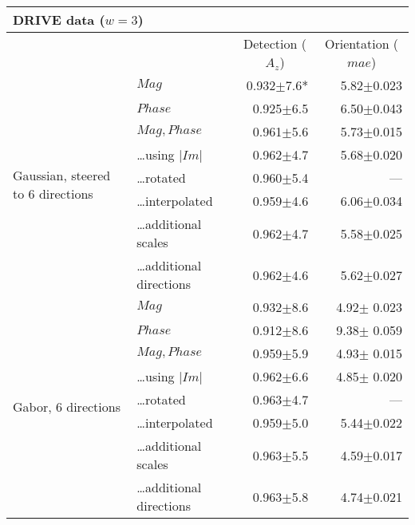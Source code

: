 
\begin{tabularx}{\columnwidth}{X X r r}
\toprule
\multicolumn{4}{p{\columnwidth}}{ DRIVE data ($w = 3$)} \\
\midrule
        &                               & \multicolumn{1}{c}{Detection  \linebreak ($A_z$)}
                                        & \multicolumn{1}{c}{Orientation  \linebreak ($mae$)} \\
\midrule
\multirow{8}{2cm}{Gaussian, steered to 6 directions}
        & $Mag$                         & 0.932$\pm$7.6*    & 5.82$\pm$0.023 \\
        & $Phase$                       & 0.925$\pm$6.5    & 6.50$\pm$0.043 \\
        & $Mag, Phase$                  & 0.961$\pm$5.6     & 5.73$\pm$0.015 \\
        & \ldots using $|Im|$           & 0.962$\pm$4.7     & 5.68$\pm$0.020 \\
        & \ldots rotated                & 0.960$\pm$5.4     & --- \\
        & \ldots interpolated           & 0.959$\pm$4.6     & 6.06$\pm$0.034 \\
        & \ldots additional scales      & 0.962$\pm$4.7     & 5.58$\pm$0.025 \\
        & \ldots additional directions  & 0.962$\pm$4.6     & 5.62$\pm$0.027 \\
\midrule
\multirow{8}{2cm}{Gabor, 6 directions}
        & $Mag$                         & 0.932$\pm$8.6     & 4.92$\pm$ 0.023 \\
        & $Phase$                       & 0.912$\pm$8.6     & 9.38$\pm$ 0.059 \\
        & $Mag,Phase$                   & 0.959$\pm$5.9     & 4.93$\pm$ 0.015 \\
        & \ldots using $|Im|$           & 0.962$\pm$6.6     & 4.85$\pm$ 0.020 \\
        & \ldots rotated                & 0.963$\pm$4.7     & --- \\
        & \ldots interpolated           & 0.959$\pm$5.0     & 5.44$\pm$0.022 \\
        & \ldots additional scales      & 0.963$\pm$5.5     & 4.59$\pm$0.017 \\
        & \ldots additional directions  & 0.963$\pm$5.8     & 4.74$\pm$0.021 \\

\end{tabularx}
